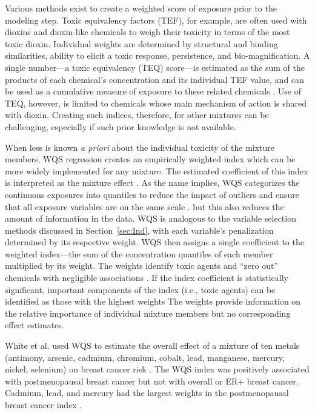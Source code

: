 Various methods exist to create a weighted score of exposure prior to the modeling step. Toxic equivalency factors (TEF), for example, are often used with dioxins and dioxin-like chemicals to weigh their toxicity in terms of the most toxic dioxin. Individual weights are determined by structural and binding similarities, ability to elicit a toxic response, persistence, and bio-magnification. A single number---a toxic equivalency (TEQ) score---is estimated as the sum of the products of each chemical's concentration and its individual TEF value, and can be used as a cumulative measure of exposure to these related chemicals \cite{van20062005, mitro2015cross}. Use of TEQ, however, is limited to chemicals whose main mechanism of action is shared with dioxin. Creating such indices, therefore, for other mixtures can be challenging, especially if such prior knowledge is not available.

When less is known \textit{a priori} about the individual toxicity of the mixture members, WQS regression creates an empirically weighted index which can be more widely implemented for any mixture. The estimated coefficient of this index is interpreted as the mixture effect \cite{carrico15}. As the name implies, WQS categorizes the continuous exposures into quantiles to reduce the impact of outliers and ensure that all exposure variables are on the same scale \cite{carrico15, gennings2013cohort}. but this also reduces the amount of information in the data. WQS is analogous to the variable selection methods discussed in Section~\ref{sec:Ind}, with each variable's penalization determined by its respective weight. WQS then assigns a single coefficient to the weighted index---the sum of the concentration quantiles of each member multiplied by its weight. The weights identify toxic agents and ``zero out'' chemicals with negligible associations \cite{carrico15, christensen2013multiple}. If the index coefficient is statistically significant, important components of the index (i.e., toxic agents) can be identified as those with the highest weights \cite{carrico15} The weights provide information on the relative importance of individual mixture members but no corresponding effect estimates. 

White et al. used WQS to estimate the overall effect of a mixture of ten metals (antimony, arsenic, cadmium, chromium, cobalt, lead, manganese, mercury, nickel, selenium) on breast cancer risk \cite{white2018metallic}. The WQS index was positively associated with postmenopausal breast cancer but not with overall or ER+ breast cancer. Cadmium, lead, and mercury had the largest weights in the postmenopausal breast cancer index \cite{white2018metallic}.

